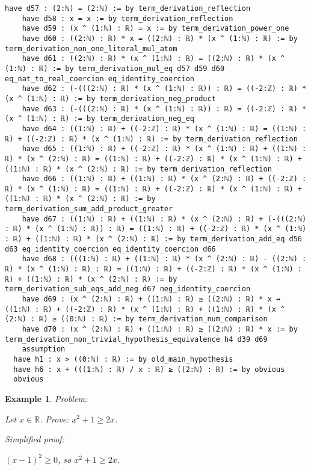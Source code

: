 \documentclass{article}
\newtheorem{example}{Example}
\begin{document}
\begin{tcolorbox}[colback=white!10, width=\linewidth]
\begin{lstlisting}[language=Lean4]
    have d57 : (2:ℕ) = (2:ℕ) := by term_derivation_reflection
    have d58 : x = x := by term_derivation_reflection
    have d59 : (x ^ (1:ℕ) : ℝ) = x := by term_derivation_power_one
    have d60 : ((2:ℕ) : ℝ) * x = ((2:ℕ) : ℝ) * (x ^ (1:ℕ) : ℝ) := by term_derivation_non_one_literal_mul_atom
    have d61 : ((2:ℕ) : ℝ) * (x ^ (1:ℕ) : ℝ) = ((2:ℕ) : ℝ) * (x ^ (1:ℕ) : ℝ) := by term_derivation_mul_eq d57 d59 d60 eq_nat_to_real_coercion eq_identity_coercion
    have d62 : (-(((2:ℕ) : ℝ) * (x ^ (1:ℕ) : ℝ)) : ℝ) = ((-2:ℤ) : ℝ) * (x ^ (1:ℕ) : ℝ) := by term_derivation_neg_product
    have d63 : (-(((2:ℕ) : ℝ) * (x ^ (1:ℕ) : ℝ)) : ℝ) = ((-2:ℤ) : ℝ) * (x ^ (1:ℕ) : ℝ) := by term_derivation_neg_eq
    have d64 : ((1:ℕ) : ℝ) + ((-2:ℤ) : ℝ) * (x ^ (1:ℕ) : ℝ) = ((1:ℕ) : ℝ) + ((-2:ℤ) : ℝ) * (x ^ (1:ℕ) : ℝ) := by term_derivation_reflection
    have d65 : ((1:ℕ) : ℝ) + ((-2:ℤ) : ℝ) * (x ^ (1:ℕ) : ℝ) + ((1:ℕ) : ℝ) * (x ^ (2:ℕ) : ℝ) = ((1:ℕ) : ℝ) + ((-2:ℤ) : ℝ) * (x ^ (1:ℕ) : ℝ) + ((1:ℕ) : ℝ) * (x ^ (2:ℕ) : ℝ) := by term_derivation_reflection
    have d66 : ((1:ℕ) : ℝ) + ((1:ℕ) : ℝ) * (x ^ (2:ℕ) : ℝ) + ((-2:ℤ) : ℝ) * (x ^ (1:ℕ) : ℝ) = ((1:ℕ) : ℝ) + ((-2:ℤ) : ℝ) * (x ^ (1:ℕ) : ℝ) + ((1:ℕ) : ℝ) * (x ^ (2:ℕ) : ℝ) := by term_derivation_sum_add_product_greater
    have d67 : ((1:ℕ) : ℝ) + ((1:ℕ) : ℝ) * (x ^ (2:ℕ) : ℝ) + (-(((2:ℕ) : ℝ) * (x ^ (1:ℕ) : ℝ)) : ℝ) = ((1:ℕ) : ℝ) + ((-2:ℤ) : ℝ) * (x ^ (1:ℕ) : ℝ) + ((1:ℕ) : ℝ) * (x ^ (2:ℕ) : ℝ) := by term_derivation_add_eq d56 d63 eq_identity_coercion eq_identity_coercion d66
    have d68 : (((1:ℕ) : ℝ) + ((1:ℕ) : ℝ) * (x ^ (2:ℕ) : ℝ) - ((2:ℕ) : ℝ) * (x ^ (1:ℕ) : ℝ) : ℝ) = ((1:ℕ) : ℝ) + ((-2:ℤ) : ℝ) * (x ^ (1:ℕ) : ℝ) + ((1:ℕ) : ℝ) * (x ^ (2:ℕ) : ℝ) := by term_derivation_sub_eqs_add_neg d67 neg_identity_coercion
    have d69 : (x ^ (2:ℕ) : ℝ) + ((1:ℕ) : ℝ) ≥ ((2:ℕ) : ℝ) * x ↔ ((1:ℕ) : ℝ) + ((-2:ℤ) : ℝ) * (x ^ (1:ℕ) : ℝ) + ((1:ℕ) : ℝ) * (x ^ (2:ℕ) : ℝ) ≥ ((0:ℕ) : ℝ) := by term_derivation_num_comparison
    have d70 : (x ^ (2:ℕ) : ℝ) + ((1:ℕ) : ℝ) ≥ ((2:ℕ) : ℝ) * x := by term_derivation_non_trivial_hypothesis_equivalence h4 d39 d69
    assumption
  have h1 : x > ((0:ℕ) : ℝ) := by old_main_hypothesis
  have h6 : x + (((1:ℕ) : ℝ) / x : ℝ) ≥ ((2:ℕ) : ℝ) := by obvious
  obvious

\end{lstlisting}
\end{tcolorbox}


\begin{example}
Problem:
\begin{tcolorbox}[colback=yellow!10, width=\linewidth]
Let $x\in\mathbb{R}$. Prove: $x^2 + 1\ge 2x$.
\end{tcolorbox}

Simplified proof:
\begin{tcolorbox}[colback=blue!10, width=\linewidth]
$(x-1)^2 \ge 0$, so $x^2 + 1 \ge 2x$.
\end{tcolorbox}
\end{example}
\end{document}
